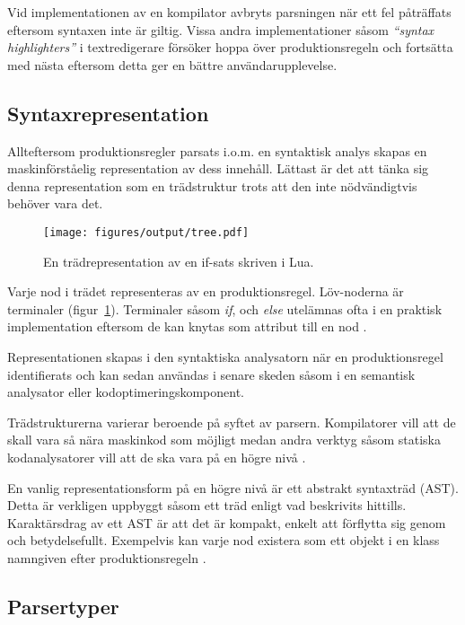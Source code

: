 Vid implementationen av en kompilator avbryts parsningen när ett fel
påträffats eftersom syntaxen inte är giltig. Vissa andra implementationer
såsom \textit{``syntax highlighters''} i textredigerare försöker hoppa över
produktionsregeln och fortsätta med nästa eftersom detta ger en bättre
användarupplevelse.

\subsection{Syntaxrepresentation}

Allteftersom produktionsregler parsats i.o.m. en syntaktisk analys skapas en
maskinförståelig representation av dess innehåll. Lättast är det att tänka sig
denna representation som en trädstruktur trots att den inte nödvändigtvis
behöver vara det.

\begin{figure}[ht]
  \texttt{[image: figures/output/tree.pdf]}
  \caption{En trädrepresentation av en if-sats skriven i Lua.}
  \label{fig:syntaxtree}
\end{figure}

Varje nod i trädet representeras av en produktionsregel. Löv-noderna är
terminaler (figur~\ref{fig:syntaxtree}). Terminaler såsom \textit{if}, och
\textit{else} utelämnas ofta i en praktisk implementation eftersom de kan
knytas som attribut till en nod \citep[s. 49]{sm09}.

Representationen skapas i den syntaktiska analysatorn när en produktionsregel
identifierats och kan sedan användas i senare skeden såsom i en semantisk
analysator eller kodoptimeringskomponent.

Trädstrukturerna varierar beroende på syftet av parsern. Kompilatorer vill
att de skall vara så nära maskinkod som möjligt medan andra verktyg såsom
statiska kodanalysatorer vill att de ska vara på en högre nivå \citep[s.
6]{pt10}.

En vanlig representationsform på en högre nivå är ett abstrakt syntaxträd
(AST).  Detta är verkligen uppbyggt såsom ett träd enligt vad beskrivits
hittills. Karaktärsdrag av ett AST är att det är kompakt, enkelt att förflytta
sig genom och betydelsefullt. Exempelvis kan varje nod existera som ett objekt
i en klass namngiven efter produktionsregeln \citep[s 77]{pt10}.

\subsection{Parsertyper}

